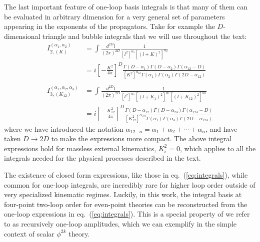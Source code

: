 \documentclass[11pt,letter]{article}
\def\eqn#1{eq.~(\ref{#1})}
\begin{document}
The last important feature of one-loop basis integrals is that many of them can be evaluated in arbitrary dimension for a very general set of parameters appearing in the exponents of the propagators. Take for example the $D$-dimensional triangle and bubble integrals \cite{Smirnov:2004ym} that we will use throughout the text:
\begin{equation}\label{eq:integrals}
{
\begin{aligned}
I_{2,(K)}^{(\alpha_1,\alpha_2)}&=\int \frac{d^{2D} l}{(2\pi)^{2D}} \frac{1}{[l^2]^{\alpha_1}[(l+K)^2]^{\alpha_2}} 
\\
&=i\left[-\frac{K^2}{4\pi}\right]^D\frac{\Gamma(D-\alpha_1)\Gamma(D-\alpha_2)\Gamma(\alpha_{12}-D)}{[K^2]^{\alpha_{12}}\Gamma(\alpha_1)\Gamma(\alpha_2)\Gamma(2D-\alpha_{12})} 
 \\\\
I_{3,(K_{12})}^{(\alpha_1,\alpha_2,\alpha_3)}&= \int \frac{d^{2D} l}{(2\pi)^{2D}} \frac{1}{[l^2]^{\alpha_1}[(l+K_1)^2]^{\alpha_2}[(l+K_{12})^2]^{\alpha_3}} 
\\
&=i\left[-\frac{K_{12}^2}{4\pi}\right]^D\frac{\Gamma(D-\alpha_{12})\Gamma(D-\alpha_{23})\Gamma(\alpha_{123}-D)}{[K_{12}^2]^{\alpha_{123}}\Gamma(\alpha_1)\Gamma(\alpha_3)\Gamma(2D-\alpha_{123})} 
\end{aligned}
}
\end{equation}
where we have introduced the notation $\alpha_{12...n} = \alpha_1+\alpha_2+\cdots +\alpha_n$, and have taken $D\rightarrow 2D$ to make the expressions more compact. The above integral expressions hold for massless external kinematics, $K_i^2=0$, which applies to all the integrals needed for the physical processes described in the text. 

The existence of closed form expressions, like those in \eqn{eq:integrals}, while common for one-loop integrals, are incredibly rare for higher loop order outside of very specialized kinematic regimes. Luckily, in this work, the integral basis at four-point two-loop order for even-point theories can be reconstructed from the one-loop expressions in \eqn{eq:integrals}. This is a special property of we refer to as recursively one-loop amplitudes, which we can exemplify in the simple context of scalar $\phi^{2k}$ theory.  
\end{document}
